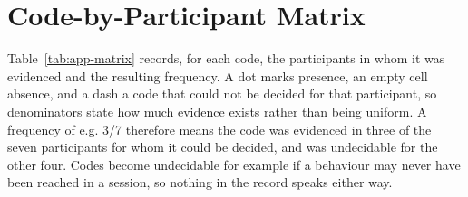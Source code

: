 \section{Code-by-Participant Matrix}
\label{app:eval-matrix}
Table~\ref{tab:app-matrix} records, for each code, the participants in whom it was evidenced and the resulting frequency. A dot marks presence, an empty cell absence, and a dash a code that could not be decided for that participant, so denominators state how much evidence exists rather than being uniform. A frequency of e.g. 3/7 therefore means the code was evidenced in three of the seven participants for whom it could be decided, and was undecidable for the other four. Codes become undecidable for example if a behaviour may never have been reached in a session, so nothing in the record speaks either way.

